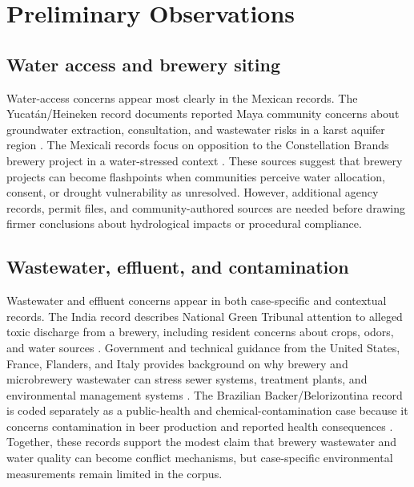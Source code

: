 \documentclass[man,12pt]{apa7}
\begin{document}
\section{Preliminary Observations}

\subsection{Water access and brewery siting}

Water-access concerns appear most clearly in the Mexican records. The Yucat\'an/Heineken record documents reported Maya community concerns about groundwater extraction, consultation, and wastewater risks in a karst aquifer region \cite{NEWS_2025_MX_heineken-yucatan-water_N001}. The Mexicali records focus on opposition to the Constellation Brands brewery project in a water-stressed context \cite{NEWS_2019_MX_constellation-mexicali-water_N005,ARTICLE_2021_MX_resistencias-cervecera-mexicali_A004}. These sources suggest that brewery projects can become flashpoints when communities perceive water allocation, consent, or drought vulnerability as unresolved. However, additional agency records, permit files, and community-authored sources are needed before drawing firmer conclusions about hydrological impacts or procedural compliance.

\subsection{Wastewater, effluent, and contamination}

Wastewater and effluent concerns appear in both case-specific and contextual records. The India record describes National Green Tribunal attention to alleged toxic discharge from a brewery, including resident concerns about crops, odors, and water sources \cite{NEWS_2025_IN_chhatarpur-toxic-discharge_N002}. Government and technical guidance from the United States, France, Flanders, and Italy provides background on why brewery and microbrewery wastewater can stress sewer systems, treatment plants, and environmental management systems \cite{REPORT_2020_US_brewery-pollution-prevention_R001,REPORT_2020_US_brewery-wastewater-bmps_R002,REPORT_2024_FR_microbrasseries-eau-effluents_R003,REPORT_2024_BE_vlarem-microbrouwerijen-afvalwater_R005,REPORT_2019_IT_effluenti-industria-birra_R006}. The Brazilian Backer/Belorizontina record is coded separately as a public-health and chemical-contamination case because it concerns contamination in beer production and reported health consequences \cite{NEWS_2020_BR_belorizontina-contaminacao_N009}. Together, these records support the modest claim that brewery wastewater and water quality can become conflict mechanisms, but case-specific environmental measurements remain limited in the corpus.
\end{document}
